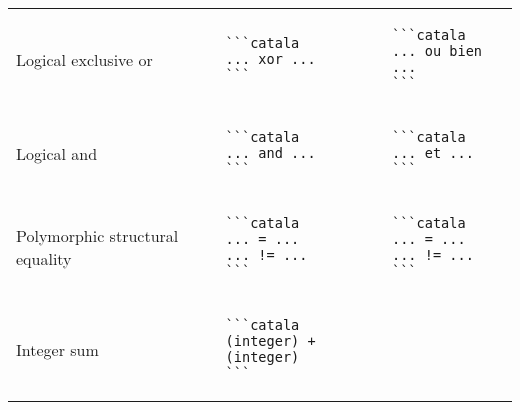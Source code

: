 \documentclass[a3paper,landscape]{article}
\begin{document}
\begin{multicols*}{2}
\begin{center}
\begin{tabular}{p{}p{}p{}}
      \\
      Logical exclusive or            &
      \vspace*{-1.75em}
      \begin{verbatim}
```catala
... xor ...
```
\end{verbatim}
      \vspace*{-1.75em}
                                      &
      \vspace*{-1.75em}
      \begin{verbatim}
```catala
... ou bien ...
```
\end{verbatim}
      \vspace*{-1.75em}
      \\
      Logical and                     &
      \vspace*{-1.75em}
      \begin{verbatim}
```catala
... and ...
```
\end{verbatim}
      \vspace*{-1.75em}
                                      &
      \vspace*{-1.75em}
      \begin{verbatim}
```catala
... et ...
```
\end{verbatim}
      \vspace*{-1.75em}
      \\
      Polymorphic structural equality &
      \vspace*{-1.75em}
      \begin{verbatim}
```catala
... = ...
... != ...
```
\end{verbatim}
      \vspace*{-1.75em}
                                      &
      \vspace*{-1.75em}
      \begin{verbatim}
```catala
... = ...
... != ...
```
\end{verbatim}
      \vspace*{-1.75em}
      \\
      Integer sum                     &
      \vspace*{-1.75em}
      \begin{verbatim}
```catala
(integer) + (integer)
```
\end{verbatim}
      \vspace*{-1.75em}
                                      &
      \vspace*{-1.75em}
      \begin{verbatim}

\end{verbatim}
\end{tabular}
\end{center}
\end{multicols*}
\end{document}
